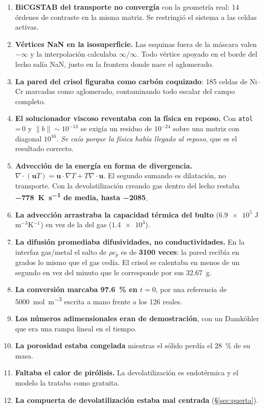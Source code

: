 \documentclass[11pt,a4paper]{article}
\begin{document}
\begin{enumerate}[leftmargin=*,itemsep=3pt]
\item \textbf{BiCGSTAB del transporte no convergía} con la geometría real: 14
órdenes de contraste en la misma matriz. Se restringió el sistema a las celdas
activas.

\item \textbf{Vértices NaN en la isosuperficie.} Las esquinas fuera de la máscara
valen $-\infty$ y la interpolación calculaba $\infty/\infty$. Todo vértice
apoyado en el borde del lecho salía NaN, justo en la frontera donde nace el
aglomerado.

\item \textbf{La pared del crisol figuraba como carbón coquizado}: 185 celdas de
Ni--Cr marcadas como aglomerado, contaminando todo escalar del campo completo.

\item \textbf{El solucionador viscoso reventaba con la física en reposo.} Con
\texttt{atol}\,=\,0 y $\lVert b\rVert\sim10^{-13}$ se exigía un residuo de
$10^{-24}$ sobre una matriz con diagonal $10^{16}$. \emph{Se caía porque la
física había llegado al reposo}, que es el resultado correcto.

\item \textbf{Advección de la energía en forma de divergencia.}
$\nabla\!\cdot\!(\mathbf{u}T)=\mathbf{u}\!\cdot\!\nabla T+T\nabla\!\cdot\!\mathbf{u}$.
El segundo sumando es dilatación, no transporte. Con la devolatilización creando
gas dentro del lecho restaba \textbf{\SI{-778}{\kelvin\per\second} de media,
hasta \SI{-2085}{}}.

\item \textbf{La advección arrastraba la capacidad térmica del bulto}
($\num{6.9e5}$ J\,m$^{-3}$K$^{-1}$) en vez de la del gas ($\num{1.4e3}$).

\item \textbf{La difusión promediaba difusividades, no conductividades.} En la
interfaz gas/metal el salto de $\rho c_p$ es de \textbf{3100 veces}: la pared
recibía en grados lo mismo que el gas cedía. El crisol se calentaba en menos de
un segundo en vez del minuto que le corresponde por sus \SI{32.67}{\gram}.

\item \textbf{La conversión marcaba \qty{97.6}{\percent} en $t=0$}, por una
referencia de \SI{5000}{\mol\per\cubic\metre} escrita a mano frente a los
\SI{126}{} reales.

\item \textbf{Los números adimensionales eran de demostración}, con un Damköhler
que era una rampa lineal en el tiempo.

\item \textbf{La porosidad estaba congelada} mientras el sólido perdía el
\qty{28}{\percent} de su masa.

\item \textbf{Faltaba el calor de pirólisis.} La devolatilización es endotérmica
y el modelo la trataba como gratuita.

\item \textbf{La compuerta de devolatilización estaba mal centrada} (§\ref{sec:puerta}).
\end{enumerate}
\end{document}
